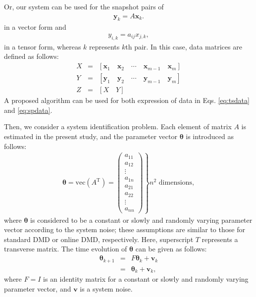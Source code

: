 \documentclass[aip,graphicx]{revtex4-1}
\begin{document}
Or, our system can be used for the snapshot pairs of 
\begin{eqnarray}
\bm{y}_{k} = A \bm{x}_k. 
\end{eqnarray}
in a vector form and 
\begin{eqnarray}
y_{i,k} = a_{ij} {x}_{j,k},
\end{eqnarray}
in a tensor form, whereas $k$ represents $k$th pair. In this case, data matrices are defined as follows:
\begin{eqnarray}
	X &=& \left[ \bm{x}_{1} \quad  \bm{x}_{2} \quad  \cdots \quad  \bm{x}_{m-1} \quad  \bm{x}_{m}\right] \nonumber\\ 
	Y &=& \left[ \bm{y}_{1} \quad  \bm{y}_{2} \quad  \cdots \quad  \bm{y}_{m-1} \quad  \bm{y}_{m}\right] \nonumber\\ 
    Z &=& [X\quad Y]\label{eq:spdata}
\end{eqnarray}
A proposed algorithm can be used for both expression of data in Eqs. \ref{eq:tsdata} and \ref{eq:spdata}.

Then, we consider a system identification problem. Each element of matrix $A$ is estimated in the present study, and the parameter vector $\bm{\theta}$ is introduced as follows:
\begin{eqnarray}
\bm{\theta} = \mathrm{vec}\left(A^\text{T}\right)=\left.\left(
\begin{array}{*{20}{c}}
{{a_{11}}}\\{{a_{12}}}\\ \vdots \\{{a_{1n}}}\\{{a_{21}}}\\{{a_{22}}}\\ \vdots \\{{a_{nn}}}
\end{array} \right) \right\}\text{$n^2$ dimensions},
\end{eqnarray}
where $\bm{\theta}$ is considered to be a constant or slowly and randomly varying parameter vector according to the system noise;  these assumptions are similar to those for standard DMD or online DMD, respectively. Here, superscript $T$ represents a transverse matrix. The time evolution of $\bm{\theta}$ can be given as follows:
\begin{eqnarray}
	\bm{\theta}_{k+1} &=& F \bm{\theta}_{k} + \bm{v}_k\\
	                  &=&\bm{\theta}_{k} + \bm{v}_k, 
	\label{eqn:theta_time_domain}
\end{eqnarray}
where $F=I$ is an identity  matrix for a constant or slowly and randomly varying parameter vector, and $\bm{v}$ is a system noise.
\end{document}
